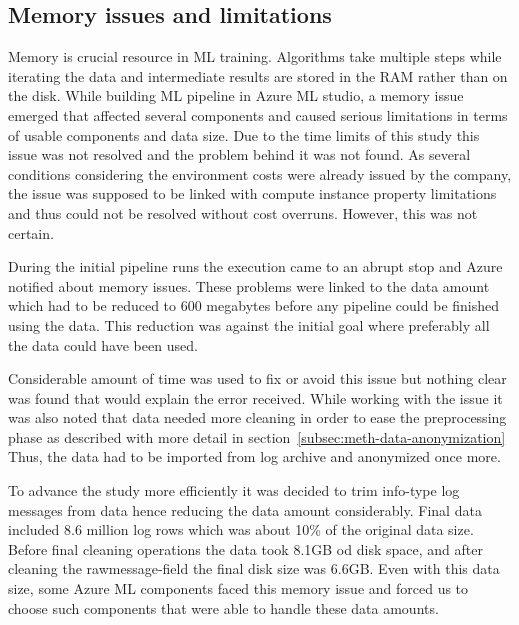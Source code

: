 



\subsection{Memory issues and limitations}\label{subsec:pipe-memory-issues}
Memory is crucial resource in ML training.
Algorithms take multiple steps while iterating the data
and intermediate results are stored in the RAM rather than on the disk.
While building ML pipeline in Azure ML studio,
a memory issue emerged
that affected several components
and caused serious limitations
in terms of usable components and data size.
Due to the time limits of this study
this issue was not resolved
and the problem behind it was not found.
As several conditions
considering the environment costs
were already issued by the company,
the issue was supposed to be linked with
compute instance property limitations
and thus could not be resolved without cost overruns.
However, this was not certain.





During the initial pipeline runs
the execution came to an abrupt stop
and Azure notified about memory issues. %
These problems were linked to the data amount
which had to be reduced to 600 megabytes
before any pipeline could be finished using the data.
This reduction was against the initial goal
where preferably all the data could have been used.

Considerable amount of time was used
to fix or avoid this issue
but nothing clear was found
that would explain the error received.
While working with the issue
it was also noted
that data needed more cleaning
in order to ease the preprocessing phase
as described with more detail in section~\ref{subsec:meth-data-anonymization}
Thus,
the data had to be imported from log archive
and anonymized once more.

To advance the study more efficiently
it was decided to trim info-type log messages from data
hence reducing the data amount considerably.
Final data included 8.6 million log rows
which was about 10\% of the original data size.
Before final cleaning operations
the data took 8.1GB od disk space,
and after cleaning the rawmessage-field
the final disk size was 6.6GB\@.
Even with this data size,
some Azure ML components faced this memory issue
and forced us to choose such components
that were able to handle these data amounts.



\clearpage